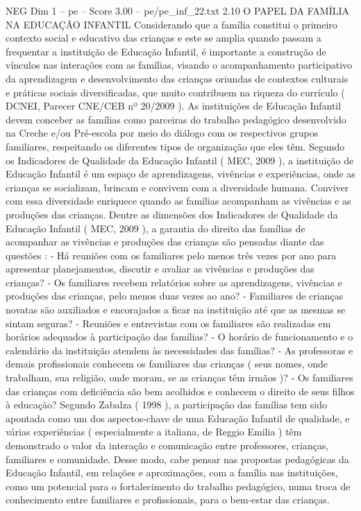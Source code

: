 \begin{textsample}{NEG Dim 1 – pe – Score 3.00 – pe/pe\_inf\_22.txt}  \label{ex:f1_neg_046}
2.10 O PAPEL DA FAMÍLIA NA EDUCAÇÃO INFANTIL Considerando que a família constitui o primeiro contexto social e educativo das crianças e este se amplia quando passam a frequentar a instituição de Educação Infantil, é importante a construção de vínculos nas interações com as famílias, visando o acompanhamento participativo da aprendizagem e desenvolvimento das crianças oriundas de contextos culturais e práticas sociais diversificadas, que muito contribuem na riqueza do currículo ( DCNEI, Parecer CNE/CEB nº 20/2009 ).
As instituições de Educação Infantil devem conceber as famílias como parceiras do trabalho pedagógico desenvolvido na Creche e/ou Pré-escola por meio do diálogo com os respectivos grupos familiares, respeitando os diferentes tipos de organização que eles têm.
Segundo os Indicadores de Qualidade da Educação Infantil ( MEC, 2009 ), a instituição de Educação Infantil é um espaço de aprendizagens, vivências e experiências, onde as crianças se socializam, brincam e convivem com a diversidade humana.
Conviver com essa diversidade enriquece quando as famílias acompanham as vivências e as produções das crianças.
Dentre as dimensões dos Indicadores de Qualidade da Educação Infantil ( MEC, 2009 ), a garantia do direito das famílias de acompanhar as vivências e produções das crianças são pensadas diante das questões : - Há reuniões com os familiares pelo menos três vezes por ano para apresentar planejamentos, discutir e avaliar as vivências e produções das crianças? - Os familiares recebem relatórios sobre as aprendizagens, vivências e produções das crianças, pelo menos duas vezes ao ano? - Familiares de crianças novatas são auxiliados e encorajados a ficar na instituição até que as mesmas se sintam seguras? - Reuniões e entrevistas com os familiares são realizadas em horários adequados à participação das famílias? - O horário de funcionamento e o calendário da instituição atendem às necessidades das famílias? - As professoras e demais profissionais conhecem os familiares das crianças ( seus nomes, onde trabalham, sua religião, onde moram, se as crianças têm irmãos )? - Os familiares das crianças com deficiência são bem acolhidos e conhecem o direito de seus filhos à educação?
Segundo Zabalza ( 1998 ), a participação das famílias tem sido apontada como um dos aspectos-chave de uma Educação Infantil de qualidade, e várias experiências ( especialmente a italiana, de Reggio Emilia ) têm demonstrado o valor da interação e comunicação entre professores, crianças, familiares e comunidade.
Desse modo, cabe pensar nas propostas pedagógicas da Educação Infantil, em relações e aproximações, com a família nas instituições, como um potencial para o fortalecimento do trabalho pedagógico, numa troca de conhecimento entre familiares e profissionais, para o bem-estar das crianças.

\end{textsample}
